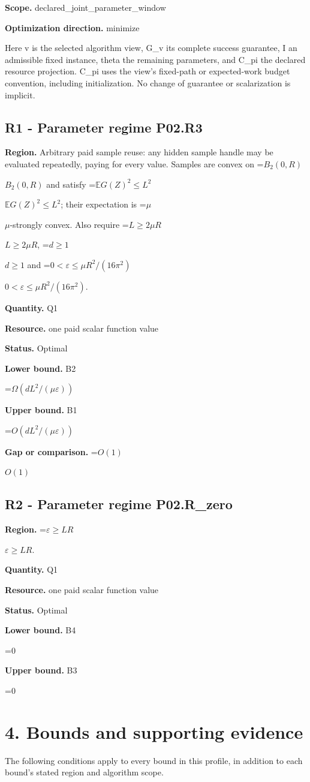 \documentclass[10pt,a4paper]{article}
\newcommand{\AtlasMath}[1]{\par\begingroup\centering\setbox0=\hbox{$\displaystyle #1$}\ifdim\wd0>1.4\linewidth\typeout{ATLAS WIDE FORMULA: \the\wd0}\fi\ifdim\wd0>\linewidth\resizebox{\linewidth}{!}{\box0}\else\box0\fi\par\endgroup}
\newcommand{\AtlasInlineMath}[1]{\begingroup\setbox0=\hbox{$#1$}\ifdim\wd0>.4\linewidth\endgroup\AtlasMath{#1}\else\endgroup$#1$\fi}
\begin{document}
\textbf{Scope.} declared\_joint\_parameter\_window

\textbf{Optimization direction.} minimize

Here v is the selected algorithm view, G\_v its complete success guarantee, I an admissible fixed instance, theta the remaining parameters, and C\_pi the declared resource projection. C\_pi uses the view's fixed-path or expected-work budget convention, including initialization. No change of guarantee or scalarization is implicit.

\subsection{R1 - Parameter regime P02.R3}
\textbf{Region.} Arbitrary paid sample reuse: any hidden sample handle may be evaluated repeatedly, paying for every value. Samples are convex on \AtlasInlineMath{B_2(0,R)} and satisfy \AtlasInlineMath{\mathbb{E}G(Z)^2\le L^2}; their expectation is \AtlasInlineMath{\mu}-strongly convex. Also require \AtlasInlineMath{L\ge2\mu R}, \AtlasInlineMath{d\ge1} and \AtlasInlineMath{0<\varepsilon\le\mu R^2/(16\pi^2)}.

\textbf{Quantity.} Q1

\textbf{Resource.} one paid scalar function value

\textbf{Status.} Optimal

\textbf{Lower bound.} B2

\AtlasMath{\Omega(dL^2/(\mu\varepsilon))}
\textbf{Upper bound.} B1

\AtlasMath{O(dL^2/(\mu\varepsilon))}
\textbf{Gap or comparison.} \AtlasInlineMath{O(1)}

\subsection{R2 - Parameter regime P02.R\_zero}
\textbf{Region.} \AtlasInlineMath{\varepsilon\ge LR}.

\textbf{Quantity.} Q1

\textbf{Resource.} one paid scalar function value

\textbf{Status.} Optimal

\textbf{Lower bound.} B4

\AtlasMath{0}
\textbf{Upper bound.} B3

\AtlasMath{0}
\section{4. Bounds and supporting evidence}
The following conditions apply to every bound in this profile, in addition to each bound's stated region and algorithm scope.
\end{document}
